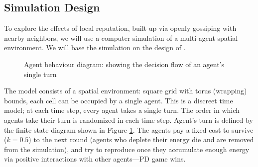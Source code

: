 \documentclass[english]{article}
\begin{document}
\subsection{Simulation Design}

To explore the effects of local reputation, built up via openly gossiping with nearby neighbors,
we will use a computer simulation of a multi-agent spatial environment.
We will base the simulation on the design of \citet{smaldino}.

\begin{figure}[h]
  \centering
  \caption{Agent behaviour diagram: showing the decision flow of an agent's single turn}
  \label{fig:agent_behaviour}
\end{figure}

The model consists of a spatial environment:
square grid with torus (wrapping) bounds,
each cell can be occupied by a single agent.
This is a discreet time model;
at each time step, every agent takes a single turn.
The order in which agents take their turn is randomized in each time step.
Agent's turn is defined by the finite state diagram shown in Figure \ref{fig:agent_behaviour}.
The agents pay a fixed cost to survive ($k = 0.5$) to the next round (agents who deplete their energy die and are removed from the simulation), and try to reproduce once they accumulate enough energy via positive interactions with other agents---PD game wins.
\end{document}
